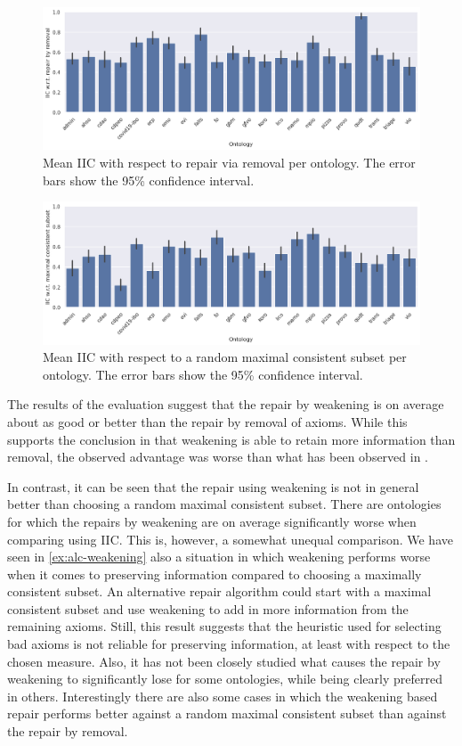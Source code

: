 \begin{figure}[ht]
  \centering
  \includegraphics[width=\textwidth]{resources/iic-remove-ontology-bar.png}
  \caption{Mean IIC with respect to repair via removal per ontology. The error bars show the 95\% confidence interval.}
  \label{fig:results-remove}
\end{figure}

\begin{figure}[ht]
  \centering
  \includegraphics[width=\textwidth]{resources/iic-mcs-ontology-bar.png}
  \caption{Mean IIC with respect to a random maximal consistent subset per ontology. The error bars show the 95\% confidence interval.}
  \label{fig:results-mcs}
\end{figure}

The results of the evaluation suggest that the repair by weakening is on average about as good or better than the repair by removal of axioms. While this supports the conclusion in \cite{troquard2018repairing} that weakening is able to retain more information than removal, the observed advantage was worse than what has been observed in \cite{troquard2018repairing}.

In contrast, it can be seen that the repair using weakening is not in general better than choosing a random maximal consistent subset. There are ontologies for which the repairs by weakening are on average significantly worse when comparing using IIC. This is, however, a somewhat unequal comparison. We have seen in \cref{ex:alc-weakening} also a situation in which weakening performs worse when it comes to preserving information compared to choosing a maximally consistent subset. An alternative repair algorithm could start with a maximal consistent subset and use weakening to add in more information from the remaining axioms. Still, this result suggests that the heuristic used for selecting bad axioms is not reliable for preserving information, at least with respect to the chosen measure. Also, it has not been closely studied what causes the repair by weakening to significantly lose for some ontologies, while being clearly preferred in others. Interestingly there are also some cases in which the weakening based repair performs better against a random maximal consistent subset than against the repair by removal.

